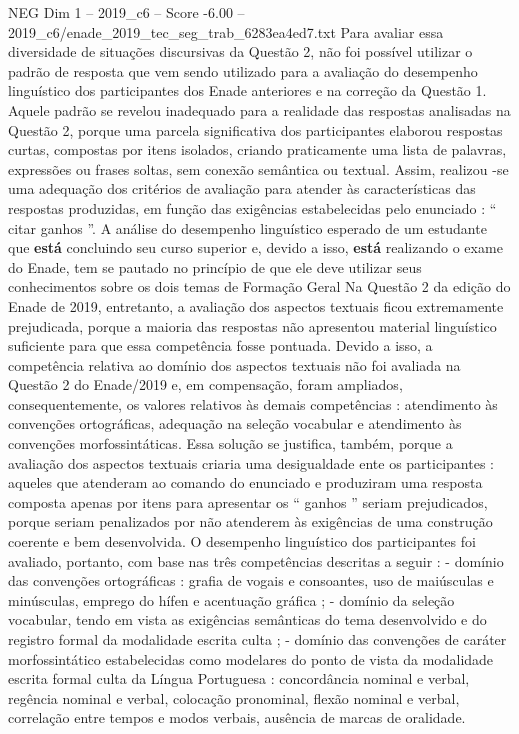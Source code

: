 \begin{textsample}{NEG Dim 1 – 2019\_c6 – Score -6.00 – 2019\_c6/enade\_2019\_tec\_seg\_trab\_6283ea4ed7.txt}
Para avaliar essa diversidade de situações discursivas da Questão 2, não foi possível utilizar o padrão de resposta que vem sendo utilizado para a avaliação do desempenho linguístico dos participantes dos Enade anteriores e na correção da Questão 1.
Aquele padrão se revelou inadequado para a realidade das respostas analisadas na Questão 2, porque uma parcela significativa dos participantes elaborou respostas curtas, compostas por itens isolados, criando praticamente uma lista de palavras, expressões ou frases soltas, sem conexão semântica ou textual.
Assim, realizou -se uma adequação dos critérios de avaliação para atender às características das respostas produzidas, em função das exigências estabelecidas pelo enunciado : “ citar ganhos ”.
A análise do desempenho linguístico esperado de um estudante que \textbf{está} concluindo seu curso superior e, devido a isso, \textbf{está} realizando o exame do Enade, tem se pautado no princípio de que ele deve utilizar seus conhecimentos sobre os dois temas de Formação Geral Na Questão 2 da edição do Enade de 2019, entretanto, a avaliação dos aspectos textuais ficou extremamente prejudicada, porque a maioria das respostas não apresentou material linguístico suficiente para que essa competência fosse pontuada.
Devido a isso, a competência relativa ao domínio dos aspectos textuais não foi avaliada na Questão 2 do Enade/2019 e, em compensação, foram ampliados, consequentemente, os valores relativos às demais competências : atendimento às convenções ortográficas, adequação na seleção vocabular e atendimento às convenções morfossintáticas.
Essa solução se justifica, também, porque a avaliação dos aspectos textuais criaria uma desigualdade ente os participantes : aqueles que atenderam ao comando do enunciado e produziram uma resposta composta apenas por itens para apresentar os “ ganhos ” seriam prejudicados, porque seriam penalizados por não atenderem às exigências de uma construção coerente e bem desenvolvida.
O desempenho linguístico dos participantes foi avaliado, portanto, com base nas três competências descritas a seguir : - domínio das convenções ortográficas : grafia de vogais e consoantes, uso de maiúsculas e minúsculas, emprego do hífen e acentuação gráfica ; - domínio da seleção vocabular, tendo em vista as exigências semânticas do tema desenvolvido e do registro formal da modalidade escrita culta ; - domínio das convenções de caráter morfossintático estabelecidas como modelares do ponto de vista da modalidade escrita formal culta da Língua Portuguesa : concordância nominal e verbal, regência nominal e verbal, colocação pronominal, flexão nominal e verbal, correlação entre tempos e modos verbais, ausência de marcas de oralidade.

\end{textsample}
